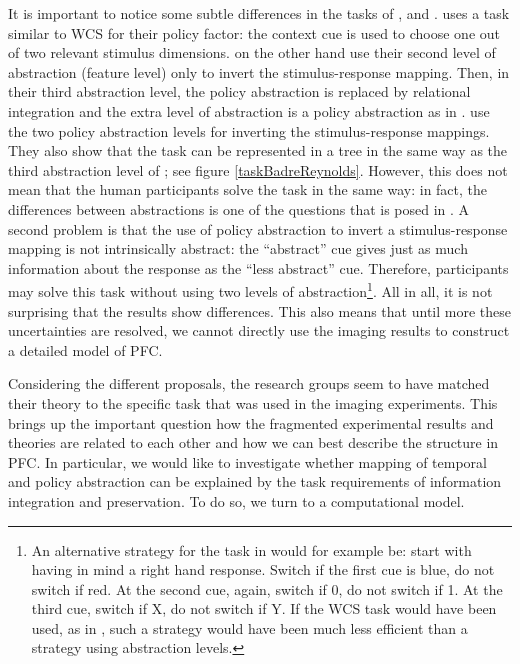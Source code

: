 \documentclass[10pt,a4paper]{report}
\begin{document}
It is important to notice some subtle differences in the tasks of \citet{Koechlin2003}, \citet{Badre2007} and \citet{Reynolds2012}. \citet{Koechlin2003} uses a task similar to WCS for their policy factor: the context cue is used to choose one out of two relevant stimulus dimensions. \citet{Badre2007} on the other hand use their second level of abstraction (feature level) only to invert the stimulus-response mapping. Then, in their third abstraction level, the policy abstraction is replaced by relational integration and the extra level of abstraction is a policy abstraction as in \citet{Koechlin2003}. \citet{Reynolds2012} use the two policy abstraction levels for inverting the stimulus-response mappings. They also show that the task can be represented in a tree in the same way as the third abstraction level of \citet{Badre2007}; see figure \ref{taskBadreReynolds}. However, this does not mean that the human participants solve the task in the same way: in fact, the differences between abstractions is one of the questions that is posed in \citet{Badre2009}. A second problem is that the use of policy abstraction to invert a stimulus-response mapping is not intrinsically abstract: the ``abstract'' cue gives just as much information about the response as the ``less abstract'' cue. Therefore, participants may solve this task without using two levels of abstraction\footnote{An alternative strategy for the task in \citet{Reynolds2012} would for example be: start with having in mind a right hand response. Switch if the first cue is blue, do not switch if red. At the second cue, again, switch if 0, do not switch if 1. At the third cue, switch if X, do not switch if Y. If the WCS task would have been used, as in \citet{Koechlin2003}, such a strategy would have been much less efficient than a strategy using abstraction levels.}. All in all, it is not surprising that the results show differences. This also means that until more these uncertainties are resolved, we cannot directly use the imaging results to construct a detailed model of PFC.

Considering the different proposals, the research groups seem to have matched their theory to the specific task that was used in the imaging experiments. This brings up the important question how the fragmented experimental results and theories are related to each other and how we can best describe the structure in PFC. In particular, we would like to investigate whether mapping of temporal and policy abstraction can be explained by the task requirements of information integration and preservation. To do so, we turn to a computational model.
\end{document}
